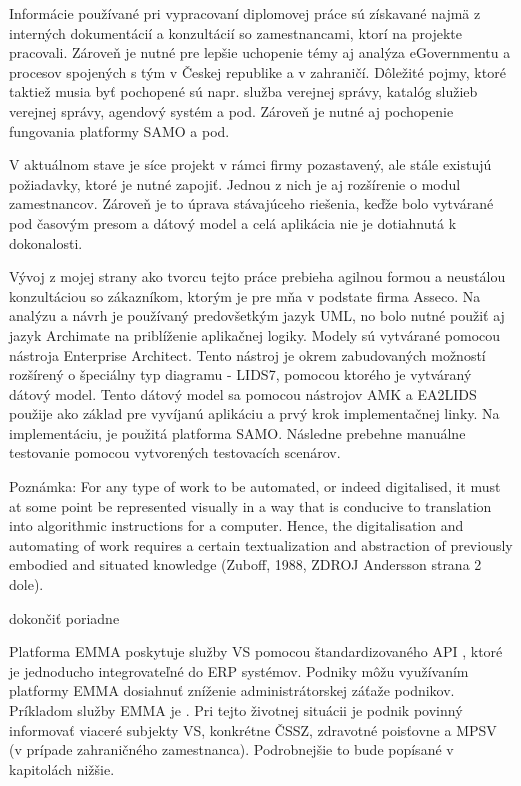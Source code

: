 Informácie používané pri vypracovaní diplomovej práce sú získavané najmä z interných dokumentácií a konzultácií so zamestnancami, ktorí na projekte pracovali. Zároveň je nutné pre lepšie uchopenie témy aj analýza eGovernmentu a procesov spojených s tým v Českej republike a v zahraničí. Dôležité pojmy, ktoré taktiež musia byť pochopené sú napr. služba verejnej správy, katalóg služieb verejnej správy, agendový systém a pod. Zároveň je nutné aj pochopenie fungovania platformy SAMO a pod.

V aktuálnom stave je síce projekt v rámci firmy pozastavený, ale stále existujú požiadavky, ktoré je nutné zapojiť. Jednou z nich je aj rozšírenie o modul zamestnancov. Zároveň je to úprava stávajúceho riešenia, keďže bolo vytvárané pod časovým presom a dátový model a celá aplikácia nie je dotiahnutá k dokonalosti. 

Vývoj z mojej strany ako tvorcu tejto práce prebieha agilnou formou a neustálou konzultáciou so zákazníkom, ktorým je pre mňa v podstate firma Asseco. Na analýzu a návrh je používaný predovšetkým jazyk UML, no bolo nutné použiť aj jazyk Archimate na priblíženie aplikačnej logiky. Modely sú vytvárané pomocou nástroja Enterprise Architect. Tento nástroj je okrem zabudovaných možností rozšírený o špeciálny typ diagramu - LIDS7, pomocou ktorého je vytváraný dátový model. Tento dátový model sa pomocou nástrojov AMK a EA2LIDS použije ako základ pre vyvíjanú aplikáciu a prvý krok implementačnej linky. Na implementáciu, je použitá platforma SAMO. Následne prebehne manuálne testovanie pomocou vytvorených testovacích scenárov.

\TODO
Poznámka: 
For any type of work to be automated, or indeed digitalised, it must
at some point be represented visually in a way that is conducive to
translation into algorithmic instructions for a computer. Hence, the
digitalisation and automating of work requires a certain textualization
and abstraction of previously embodied and situated knowledge (Zuboff, 1988, ZDROJ Andersson strana 2 dole).

\TODO dokončiť poriadne

Platforma EMMA poskytuje služby VS pomocou štandardizovaného API
, ktoré je jednoducho integrovateľné do ERP systémov. Podniky môžu využívaním platformy EMMA dosiahnuť zníženie administrátorskej záťaže podnikov. Príkladom služby EMMA je . Pri tejto životnej situácii je podnik povinný informovať viaceré subjekty VS, konkrétne ČSSZ, zdravotné poisťovne a MPSV (v prípade zahraničného zamestnanca). Podrobnejšie to bude popísané v kapitolách nižšie.

